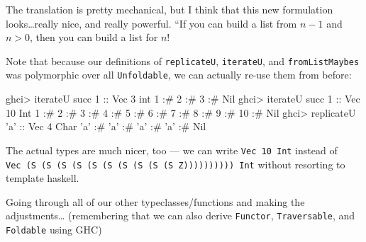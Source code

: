 \documentclass[]{article}
\newenvironment{Shaded}{}{}
\newcommand{\DataTypeTok}[1]{\textcolor[rgb]{0.56,0.13,0.00}{{#1}}}
\newcommand{\DecValTok}[1]{\textcolor[rgb]{0.25,0.63,0.44}{{#1}}}
\newcommand{\CharTok}[1]{\textcolor[rgb]{0.25,0.44,0.63}{{#1}}}
\newcommand{\OtherTok}[1]{\textcolor[rgb]{0.00,0.44,0.13}{{#1}}}
\newcommand{\FunctionTok}[1]{\textcolor[rgb]{0.02,0.16,0.49}{{#1}}}
\newcommand{\NormalTok}[1]{{#1}}
\begin{document}
The translation is pretty mechanical, but I think that this new
formulation looks\ldots{}really nice, and really powerful. ``If you can
build a list from \(n - 1\) and \(n > 0\), then you can build a list for
\(n\)!

Note that because our definitions of \texttt{replicateU},
\texttt{iterateU}, and \texttt{fromListMaybes} was polymorphic over all
\texttt{Unfoldable}, we can actually re-use them from before:

\begin{Shaded}
\begin{Highlighting}[]
\NormalTok{ghci}\FunctionTok{>} \NormalTok{iterateU succ }\DecValTok{1}\OtherTok{ ::} \DataTypeTok{Vec} \DecValTok{3} \NormalTok{int}
\DecValTok{1} \FunctionTok{:#} \DecValTok{2} \FunctionTok{:#} \DecValTok{3} \FunctionTok{:#} \DataTypeTok{Nil}
\NormalTok{ghci}\FunctionTok{>} \NormalTok{iterateU succ }\DecValTok{1}\OtherTok{ ::} \DataTypeTok{Vec} \DecValTok{10} \DataTypeTok{Int}
\DecValTok{1} \FunctionTok{:#} \DecValTok{2} \FunctionTok{:#} \DecValTok{3} \FunctionTok{:#} \DecValTok{4} \FunctionTok{:#} \DecValTok{5} \FunctionTok{:#} \DecValTok{6} \FunctionTok{:#} \DecValTok{7} \FunctionTok{:#} \DecValTok{8} \FunctionTok{:#} \DecValTok{9} \FunctionTok{:#} \DecValTok{10} \FunctionTok{:#} \DataTypeTok{Nil}
\NormalTok{ghci}\FunctionTok{>} \NormalTok{replicateU }\CharTok{'a'}\OtherTok{ ::} \DataTypeTok{Vec} \DecValTok{4} \DataTypeTok{Char}
\CharTok{'a'} \FunctionTok{:#} \CharTok{'a'} \FunctionTok{:#} \CharTok{'a'} \FunctionTok{:#} \CharTok{'a'} \FunctionTok{:#} \DataTypeTok{Nil}
\end{Highlighting}
\end{Shaded}

The actual types are much nicer, too --- we can write
\texttt{Vec\ 10\ Int} instead of
\texttt{Vec\ (S\ (S\ (S\ (S\ (S\ (S\ (S\ (S\ (S\ (S\ Z))))))))))\ Int}
without resorting to template haskell.

Going through all of our other typeclasses/functions and making the
adjustments\ldots{} (remembering that we can also derive
\texttt{Functor}, \texttt{Traversable}, and \texttt{Foldable} using GHC)
\end{document}
